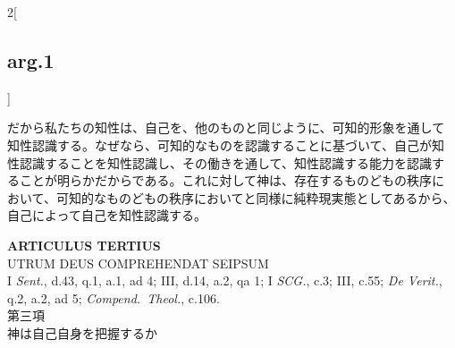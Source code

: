 \documentclass[paper=a4paper,fontsize=10pt,jafontsize=9pt,titlepage]{jlreq}
\begin{document}
\begin{paracol}{2}[\subsection{arg.1}]
\switchcolumn

だから私たちの知性は、自己を、他のものと同じように、可知的形象を通して
知性認識する。なぜなら、可知的なものを認識することに基づいて、自己が知
性認識することを知性認識し、その働きを通して、知性認識する能力を認識す
ることが明らかだからである。これに対して神は、存在するものどもの秩序に
おいて、可知的なものどもの秩序においてと同様に純粋現実態としてあるから、
自己によって自己を知性認識する。

\end{paracol}


\newpage

{}
\setcounter{section}{3}
\setcounter{subsection}{0}
\begin{center}
{\Large {\bfseries ARTICULUS TERTIUS}}\\ {\large UTRUM DEUS COMPREHENDAT
SEIPSUM}\\ {\footnotesize I {\itshape Sent.}, d.43, q.1, a.1, ad 4;
III, d.14, a.2, qa 1; I {\itshape SCG.}, c.3; III, c.55; {\itshape
De Verit.}, q.2, a.2, ad 5; {\itshape Compend.~Theol.}, c.106.}\\
{\Large 第三項\\神は自己自身を把握するか}
\end{center}
\end{document}
